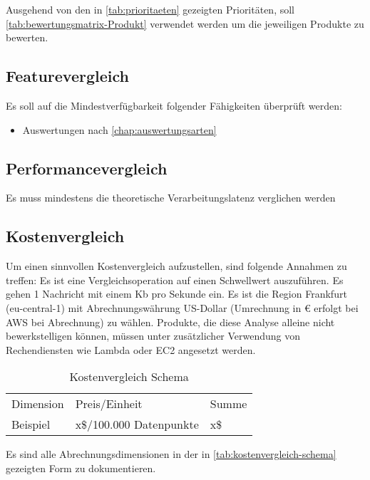 
Ausgehend von den in \autoref{tab:prioritaeten} gezeigten Prioritäten, soll \autoref{tab:bewertungsmatrix-Produkt} verwendet werden um die jeweiligen Produkte zu bewerten.

\subsection{Featurevergleich}
Es soll auf die Mindestverfügbarkeit folgender Fähigkeiten überprüft werden:
\begin{itemize}
\item Auswertungen nach \autoref{chap:auswertungsarten}
\end{itemize}

\subsection{Performancevergleich}
Es muss mindestens die theoretische Verarbeitungslatenz verglichen werden

\subsection{Kostenvergleich}
Um einen sinnvollen Kostenvergleich aufzustellen, sind folgende Annahmen zu treffen:
Es ist eine Vergleichsoperation auf einen Schwellwert auszuführen. Es gehen 1 Nachricht mit einem Kb pro Sekunde ein. Es ist die Region Frankfurt (eu-central-1) mit Abrechnungswährung US-Dollar (Umrechnung in € erfolgt bei \ac{AWS} bei Abrechnung) zu wählen. Produkte, die diese Analyse alleine nicht bewerkstelligen können, müssen unter zusätzlicher Verwendung von Rechendiensten wie Lambda oder \ac{EC2} angesetzt werden. 
\begin{table}[H]
\centering
\begin{tabular}{lll}
Dimension & Preis/Einheit           & Summe \\
Beispiel  & x\$/100.000 Datenpunkte & x\$  
\end{tabular}
\caption{Kostenvergleich Schema}
\label{tab:kostenvergleich-schema}
\end{table}
Es sind alle Abrechnungsdimensionen in der in \autoref{tab:kostenvergleich-schema} gezeigten Form zu dokumentieren.

